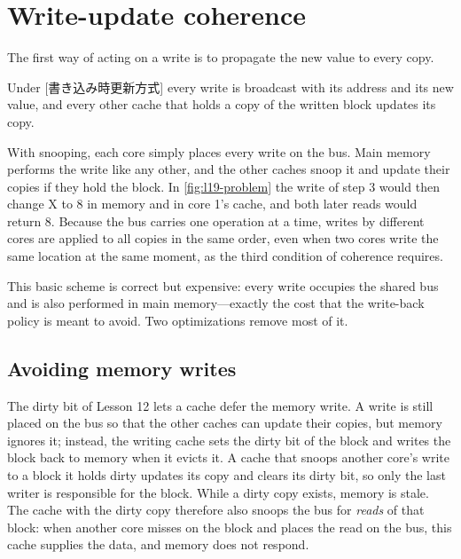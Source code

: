 \documentclass[../main.tex]{subfiles}
\begin{document}
\section{Write-update coherence}
\label{sec:l19-write-update}

The first way of acting on a write is to propagate the new value to every
copy.

\begin{definition}
  Under [書き込み時更新方式] every write is
  broadcast with its address and its new value, and every other cache that
  holds a copy of the written block updates its copy.
\end{definition}

With snooping, each core simply places every write on the bus.  Main memory
performs the write like any other, and the other caches snoop it and update
their copies if they hold the block.  In \cref{fig:l19-problem} the write of
step 3 would then change X to 8 in memory and in core 1's cache, and both
later reads would return 8.  Because the bus carries one operation at a time,
writes by different cores are applied to all copies in the same order, even
when two cores write the same location at the same moment, as the third
condition of coherence requires.

This basic scheme is correct but expensive: every write occupies the shared
bus and is also performed in main memory---exactly the cost that the
write-back policy is meant to avoid.  Two optimizations remove most of it.

\subsection{Avoiding memory writes}

The dirty bit of Lesson 12 lets a cache defer the memory write.  A write is
still placed on the bus so that the other caches can update their copies,
but memory ignores it; instead, the writing cache sets the dirty bit of the
block and writes the block back to memory when it evicts it.  A cache that
snoops another core's write to a block it holds dirty updates its copy and
clears its dirty bit, so only the last writer is responsible for the block.
While a dirty copy exists, memory is stale.  The cache with the dirty copy
therefore also snoops the bus for \emph{reads} of that block: when another
core misses on the block and places the read on the bus, this cache supplies
the data, and memory does not respond.
\end{document}
